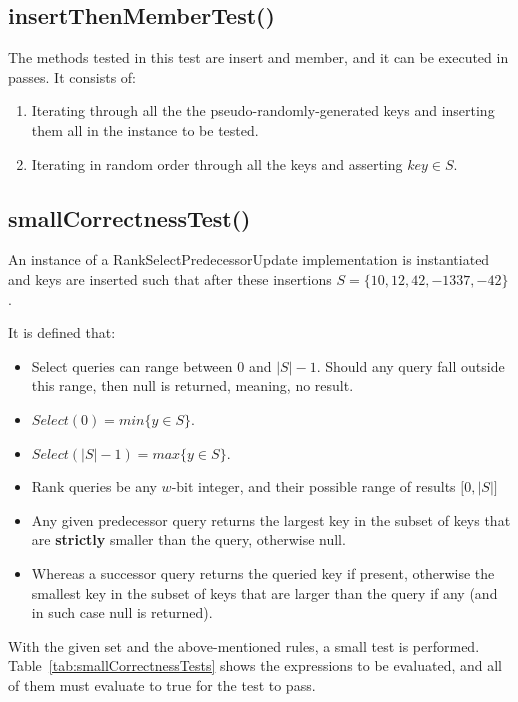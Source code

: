 \subsection{{\ttfamily insertThenMemberTest()}}

The methods tested in this test are {\ttfamily insert} and {\ttfamily member}, and it can be executed in passes. It consists of:
\begin{enumerate}
    \item
    Iterating through all the the pseudo-randomly-generated keys and inserting them all in the instance to be tested.
    \item
    Iterating in random order through all the keys and asserting $key \in S$.
\end{enumerate}
 

\subsection{{\ttfamily smallCorrectnessTest()}}

An instance of a {\ttfamily RankSelectPredecessorUpdate} implementation is instantiated and keys are inserted such that after these insertions $S = \{10, 12, 42, -1337, -42\}$.

It is defined that:
\begin{itemize}
    \item Select queries can range between $0$ and $|S|-1$. Should any query fall outside this range, then {\ttfamily null} is returned, meaning, no result.
    \item $Select(0) = min\{y \in S \}$.
    \item $Select(|S|-1) = max\{y \in S\}$.
    \item Rank queries be any $w$-bit integer, and their possible range of results $\big[ 0, |S| \big]$
    \item Any given predecessor query returns the largest key in the subset of keys that are \textbf{strictly} smaller than the query, otherwise {\ttfamily null}.
    \item Whereas a successor query returns the queried key if present, otherwise the smallest key in the subset of keys that are larger than the query if any (and in such case {\ttfamily null} is returned).
\end{itemize}

With the given set and the above-mentioned rules, a small test is performed. Table~\ref{tab:smallCorrectnessTests} shows the expressions to be evaluated, and all of them must evaluate to {\ttfamily true} for the test to pass.

